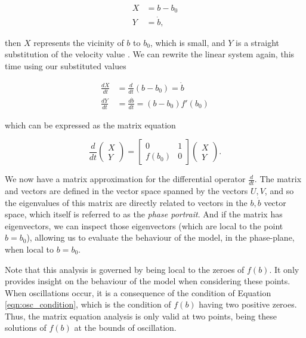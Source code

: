 \documentclass{article}
\begin{document}
\begin{align}
    X &= b - b_0 \\
    Y &= \dot{b},
\end{align}

then $X$ represents the vicinity of $b$ to $b_0$, which is small,
and $Y$ is a straight substitution of the velocity value .
We can rewrite the linear system again, this time using our substituted values

\begin{align}
    \frac{dX}{dt} &= \frac{d}{dt}\left(b-b_0\right) = \dot{b} \\
    \frac{dY}{dt} &= \frac{d\dot{b}}{dt} = (b-b_0)f'(b_0)
\end{align}

which can be expressed as the matrix equation

\begin{equation}
    \frac{d}{dt}\begin{pmatrix}
        X \\
        Y
    \end{pmatrix} = \begin{bmatrix}
        0 & 1 \\
        f(b_0) & 0
    \end{bmatrix} \begin{pmatrix}
        X \\
        Y
    \end{pmatrix}.
    \label{eqn:first_order_approximated_substituted_matrix}
\end{equation}


We now have a matrix approximation for the differential operator $\frac{d}{dt}$.
The matrix and vectors are defined in the vector space spanned by the vectors $U,V$,
and so the eigenvalues of this matrix are directly related to vectors in the $b,\dot{b}$ vector space,
which itself is referred to as the \textit{phase portrait}.
And if the matrix has eigenvectors, we can inspect those eigenvectors (which are local to the point $b=b_0$),
allowing us to evaluate the behaviour of the model, in the phase-plane,
when local to $b=b_0$.

Note that this analysis is governed by being local to the zeroes of $f(b)$.
It only provides insight on the behaviour of the model when considering these points.
When oscillations occur, it is a consequence of the condition of Equation \ref{eqn:osc_condition},
which is the condition of $f(b)$ having two positive zeroes.
Thus, the matrix equation analysis is only valid at two points,
being these solutions of $f(b)$ at the bounds of oscillation.
\end{document}

